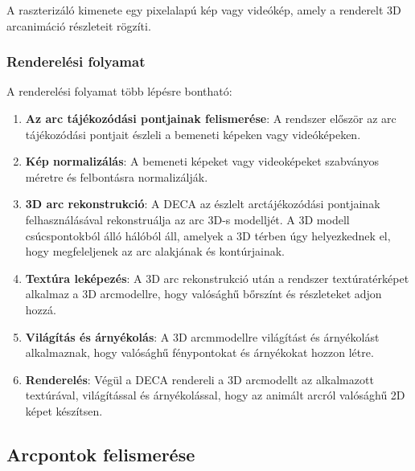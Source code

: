 \documentclass[12pt,a4]{article}
\begin{document}
                A raszterizáló kimenete egy pixelalapú kép vagy videókép, amely a renderelt 3D arcanimáció részleteit rögzíti.

            \subsubsection{Renderelési folyamat}

                A renderelési folyamat több lépésre bontható:

                \begin{enumerate}
                    \item \textbf{Az arc tájékozódási pontjainak felismerése}: A rendszer először az arc tájékozódási pontjait észleli a bemeneti képeken vagy videóképeken. 

                    \item \textbf{Kép normalizálás}: A bemeneti képeket vagy videoképeket szabványos méretre és felbontásra normalizálják.

                    \item \textbf{3D arc rekonstrukció}: A DECA az észlelt arctájékozódási pontjainak felhasználásával rekonstruálja az arc 3D-s modelljét. A 3D modell csúcspontokból álló hálóból áll, amelyek a 3D térben úgy helyezkednek el, hogy megfeleljenek az arc alakjának és kontúrjainak.

                    \item \textbf{Textúra leképezés}: A 3D arc rekonstrukció után a rendszer textúratérképet alkalmaz a 3D arcmodellre, hogy valósághű bőrszínt és részleteket adjon hozzá.

                    \item \textbf{Világítás és árnyékolás}: A 3D arcmmodellre világítást és árnyékolást alkalmaznak, hogy valósághű fénypontokat és árnyékokat hozzon létre. 

                    \item \textbf{Renderelés}: Végül a DECA rendereli a 3D arcmodellt az alkalmazott textúrával, világítással és árnyékolással, hogy az animált arcról valósághű 2D képet készítsen.
                    
                \end{enumerate}

            \subsection{Arcpontok felismerése} \label{FAN}
\end{document}
